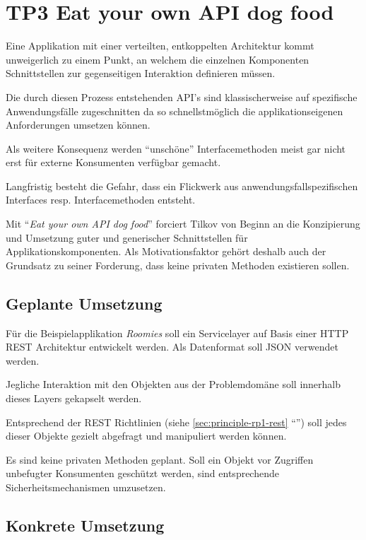 \section{TP3 Eat your own API dog food}
\label{sec:principle-tp3-eat-your-own-api}

Eine Applikation mit einer verteilten, entkoppelten Architektur kommt unweigerlich zu einem Punkt, an welchem die einzelnen Komponenten Schnittstellen zur gegenseitigen Interaktion definieren müssen.

Die durch diesen Prozess entstehenden API's sind klassischerweise auf spezifische Anwendungsfälle zugeschnitten da so schnellstmöglich die applikationseigenen Anforderungen umsetzen können.

Als weitere Konsequenz werden ``unschöne'' Interfacemethoden meist gar nicht erst für externe Konsumenten verfügbar gemacht.

Langfristig besteht die Gefahr, dass ein Flickwerk aus anwendungsfallspezifischen Interfaces resp. Interfacemethoden entsteht.

Mit ``\emph{Eat your own API dog food}'' forciert Tilkov von Beginn an die Konzipierung und Umsetzung guter und generischer Schnittstellen für Applikationskomponenten. Als Motivationsfaktor gehört deshalb auch der Grundsatz zu seiner Forderung, dass keine privaten Methoden existieren sollen.


\subsection*{Geplante Umsetzung}

Für die Beispielapplikation \emph{Roomies} soll ein Servicelayer auf Basis einer HTTP \gls{REST} Architektur entwickelt werden. Als Datenformat soll \gls{JSON} verwendet werden.

Jegliche Interaktion mit den Objekten aus der Problemdomäne soll innerhalb dieses Layers gekapselt werden.

Entsprechend der \gls{REST} Richtlinien (siehe \ref{sec:principle-rp1-rest} ``'') soll jedes dieser Objekte gezielt abgefragt und manipuliert werden können.

Es sind keine privaten Methoden geplant. Soll ein Objekt vor Zugriffen unbefugter Konsumenten geschützt werden, sind entsprechende Sicherheitsmechanismen umzusetzen.


\subsection*{Konkrete Umsetzung}

